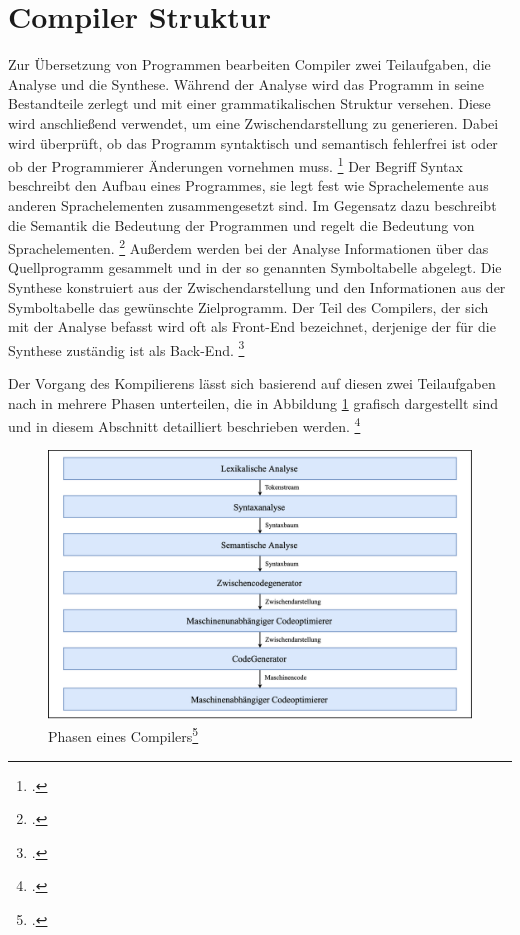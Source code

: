 \section{Compiler Struktur}
Zur Übersetzung von Programmen bearbeiten Compiler zwei Teilaufgaben,  die Analyse und die Synthese. Während der Analyse wird das Programm in seine Bestandteile zerlegt und mit einer grammatikalischen Struktur versehen. Diese wird anschließend verwendet, um eine Zwischendarstellung zu generieren.  Dabei wird überprüft, ob das Programm syntaktisch und semantisch fehlerfrei ist oder ob der Programmierer Änderungen vornehmen muss. \footcite[Vgl.][S. 6f]{Ullmann2008} Der Begriff Syntax beschreibt den Aufbau eines Programmes,  sie legt fest wie Sprachelemente aus anderen Sprachelementen zusammengesetzt sind.  Im Gegensatz dazu beschreibt die Semantik die Bedeutung der Programmen und regelt die Bedeutung von Sprachelementen.  \footcite[Vgl.][S. 36]{Schneider1975}  Außerdem werden bei der Analyse Informationen über das Quellprogramm gesammelt und in der so genannten Symboltabelle abgelegt.  Die Synthese konstruiert aus der Zwischendarstellung und den Informationen aus der Symboltabelle das gewünschte Zielprogramm.  Der Teil des Compilers, der sich mit der Analyse befasst wird oft als Front-End bezeichnet, derjenige der für die Synthese zuständig ist als Back-End.  \footcite[Vgl.][S. 6f]{Ullmann2008}

Der Vorgang des Kompilierens lässt sich basierend auf diesen zwei Teilaufgaben nach \citeauthor{Ullmann2008} in mehrere Phasen unterteilen,  die in Abbildung \ref{fig:Compilerphasen} grafisch dargestellt sind und in diesem Abschnitt detailliert beschrieben werden.  \footcite[Vgl.][S. 6]{Ullmann2008}

\begin{figure}[!ht]
 \includegraphics[width=\textwidth,keepaspectratio]{Images/Compiler/Phasen.png}
 \caption[Phasen eines Compilers]{Phasen eines Compilers\protect\footcite{Ullmann2008}}
 \label{fig:Compilerphasen}
\end{figure}


